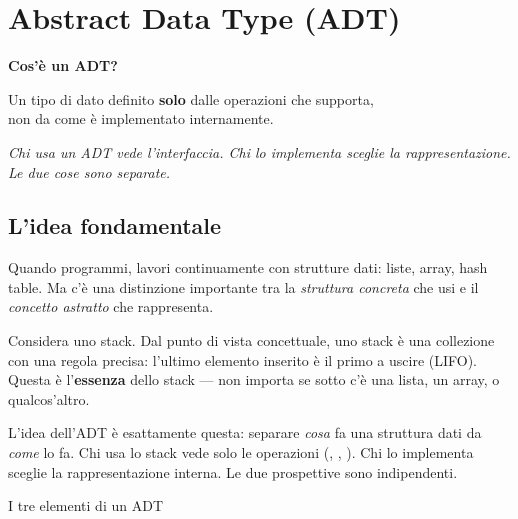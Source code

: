 
\chapter{Abstract Data Type (ADT)}
\label{app:adt}

\begin{intuizione}
{\large\bfseries Cos'è un ADT?}

\medskip
Un tipo di dato definito \textbf{solo} dalle operazioni che supporta,\\
\textcolor{black!60}{non da come è implementato internamente.}

\medskip
\textcolor{csTeal}{\itshape Chi usa un ADT vede l'interfaccia.
Chi lo implementa sceglie la rappresentazione.
Le due cose sono separate.}
\end{intuizione}

\vspace{4pt}

\section{L'idea fondamentale}

Quando programmi, lavori continuamente con strutture dati: liste,
array, hash table. Ma c'è una distinzione importante tra la
\emph{struttura concreta} che usi e il \emph{concetto astratto}
che rappresenta.

Considera uno stack. Dal punto di vista concettuale, uno stack è
una collezione con una regola precisa: l'ultimo elemento inserito
è il primo a uscire (LIFO). Questa è l'\textbf{essenza} dello stack
--- non importa se sotto c'è una lista, un array, o qualcos'altro.

L'idea dell'ADT è esattamente questa: separare \emph{cosa} fa
una struttura dati da \emph{come} lo fa. Chi usa lo stack vede
solo le operazioni (, , ). Chi lo implementa
sceglie la rappresentazione interna. Le due prospettive sono
indipendenti.

\begin{concetto}{I tre elementi di un ADT}
\end{concetto}

